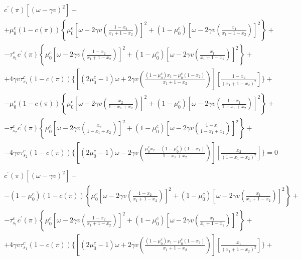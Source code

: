 \documentclass[12pt,a4paper]{article}
\begin{document}
\begin{small}
\begin{eqnarray}
\label{focx12}
    \begin{split}
        c^\prime(\pi)\left[(\omega-\gamma v)^2\right]+ \\
        +\mu_0^c(1-c(\pi))\left\{\mu_0^c\left[\omega-2\gamma v\left(\frac{1-x_2}{x_1+1-x_2}\right)\right]^2+(1-\mu_0^c)\left[\omega-2\gamma v\left(\frac{x_1}{x_1+1-x_2}\right)\right]^2\right\}+ \\
        -\tau_{s_1}^cc^\prime(\pi)\left\{\mu_0^c\left[\omega-2\gamma v\left(\frac{1-x_2}{x_1+1-x_2}\right)\right]^2+(1-\mu_0^c)\left[\omega-2\gamma v\left(\frac{x_1}{x_1+1-x_2}\right)\right]^2\right\}+ \\
        +4\gamma v\tau_{s_1}^c(1-c(\pi))\Bigg\{\left[(2\mu_0^c-1)\omega+2\gamma v\left(\frac{(1-\mu_0^c)x_1-\mu_0^c(1-x_2)}{x_1+1-x_2}\right)\right]\left[\frac{1-x_2}{(x_1+1-x_2)^2}\right]\Bigg\}+\\
        -\mu_0^c(1-c(\pi))\left\{\mu_0^c\left[\omega-2\gamma v\left(\frac{x_2}{1-x_1+x_2}\right)\right]^2+(1-\mu_0^c)\left[\omega-2\gamma v\left(\frac{1-x_1}{1-x_1+x_2}\right)\right]^2\right\}+\\
        -\tau_{s_2}^cc^\prime(\pi)\left\{\mu_0^c\left[\omega-2\gamma v\left(\frac{x_2}{1-x_1+x_2}\right)\right]^2+(1-\mu_0^c)\left[\omega-2\gamma v\left(\frac{1-x_1}{1-x_1+x_2}\right)\right]^2\right\}+\\
        -4\gamma v\tau_{s_2}^c(1-c(\pi))\Bigg\{\left[(2\mu_0^c-1)\omega-2\gamma v\left(\frac{\mu_0^cx_2-(1-\mu_0^c)(1-x_1)}{1-x_1+x_2}\right)\right]\left[\frac{x_2}{(1-x_1+x_2)^2}\right]\Bigg\}=0
    \end{split} \\
    \label{focx22}
    \begin{split}
        c^\prime(\pi)\left[(\omega-\gamma v)^2\right]+ \\
        -(1-\mu_0^c)(1-c(\pi))\left\{\mu_0^c\left[\omega-2\gamma v\left(\frac{1-x_2}{x_1+1-x_2}\right)\right]^2+(1-\mu_0^c)\left[\omega-2\gamma v\left(\frac{x_1}{x_1+1-x_2}\right)\right]^2\right\}+ \\
        -\tau_{s_1}^cc^\prime(\pi)\left\{\mu_0^c\left[\omega-2\gamma v\left(\frac{1-x_2}{x_1+1-x_2}\right)\right]^2+(1-\mu_0^c)\left[\omega-2\gamma v\left(\frac{x_1}{x_1+1-x_2}\right)\right]^2\right\}+ \\
        +4\gamma v\tau_{s_1}^c(1-c(\pi))\Bigg\{\left[(2\mu_0^c-1)\omega+2\gamma v\left(\frac{(1-\mu_0^c)x_1-\mu_0^c(1-x_2)}{x_1+1-x_2}\right)\right]\left[\frac{x_1}{(x_1+1-x_2)^2}\right]\Bigg\}+\\

\end{split}
\end{eqnarray}
\end{small}
\end{document}
